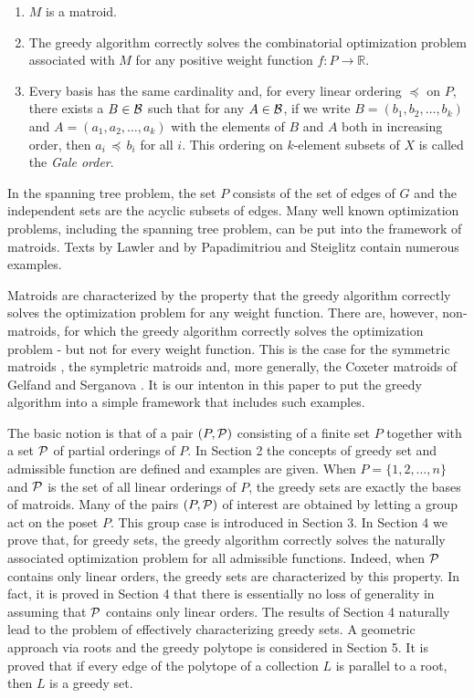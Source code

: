 \documentclass[12pt]{article}
\newcommand{\R}{{\mathbb R}}
\newcommand{\p}{{\preceq}}
\renewcommand{\P}{{\cal P}}
\begin{document}
\begin{enumerate}
\item $M$ is a matroid.
\item The greedy algorithm correctly solves the combinatorial
optimization problem associated with $M$ for any positive weight function
$f: P \rightarrow \R$.
\item Every basis has the same cardinality and, for every linear
ordering $\p$ on $P$, there exists a $B \in \cal B$ such that for any
$A \in \cal B$, if we write $B = (b_1,b_2,\dots,b_k)$ and $A=(a_1,
a_2, \dots, a_k)$ with the elements of $B$ and $A$ both in
increasing order, then $a_i\, \p \,b_i$ for all $i$.  This ordering
on $k$-element subsets of $X$ is called the {\it Gale order}.
\end{enumerate}

In the spanning tree problem, the set $P$ consists of the set of
edges of $G$ and the independent sets are the acyclic subsets of
edges. Many well known optimization problems, including the spanning
tree problem, can be put into the framework of matroids.  Texts by
Lawler \cite{lawler} and by Papadimitriou and Steiglitz \cite{pap}
contain numerous examples.

Matroids are characterized by the property that the greedy algorithm
correctly solves the optimization problem for any weight function.
There are, however, non-matroids, for which the greedy algorithm
correctly solves the optimization problem - but not for every weight
function.  This is the case for the symmetric matroids \cite{bou}, the
sympletric matroids \cite{BGW} and, more generally, the Coxeter
matroids of Gelfand and Serganova \cite{GS1,GS2}.  It is our intenton
in this paper to put the greedy algorithm into a simple framework that
includes such examples.

The basic notion is that of a pair $(P, \P)$ consisting of a finite
set $P$ together with a set $\P$ of partial orderings of $P$.  In
Section 2 the concepts of greedy set and admissible function are
defined and examples are given.  When $P = \{1,2, \dots , n\}$ and
$\P$ is the set of all linear orderings of $P$, the greedy sets are
exactly the bases of matroids.  Many of the pairs $(P, \P)$ of interest are
obtained by letting a group act on the poset $P$.  This group case is
introduced in Section 3.  In Section 4 we prove that, for greedy sets,
the greedy algorithm correctly solves the naturally associated
optimization problem for all admissible functions.  Indeed, when $\P$
contains only linear orders, the greedy sets are characterized by this
property.  In fact, it is proved in Section 4 that there is
essentially no loss of generality in assuming that $\P$ contains only
linear orders.  The results of Section 4 naturally lead to the problem
of effectively characterizing greedy sets.  A geometric approach via
roots and the greedy polytope is considered in Section 5.  It is
proved that if every edge of the polytope of a collection $L$ is
parallel to a root, then $L$ is a greedy set.
\end{document}
